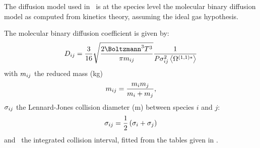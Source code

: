 The diffusion model used in \Antioch\ is at the species
level the molecular binary diffusion model as computed from kinetics
theory, assuming the ideal gas hypothesis.

The molecular binary diffusion coefficient is given by:
\begin{equation}
\diff[ij] = \frac{3}{16} \sqrt{\frac{2\Boltzmann^3\Temp^3}{\pi\Mass_{ij}}}\frac{1}{\Press\LJdia_{ij}^2\Stockmayer{1}}
\label{bimol_diff:eq}
\end{equation}
with $\Mass_{ij}$ the reduced mass (\unit{kg})
\begin{equation}
\Mass_{ij} = \frac{\Mass_i\Mass_j}{\Mass_i + \Mass_j},
\label{diffusion:bimol:red_mass}
\end{equation}
$\LJdia_{ij}$ the Lennard-Jones collision diameter (\unit{m})
between species $i$ and $j$:
\begin{equation}
\LJdia_{ij} = \frac{1}{2}\left(\LJdia_i + \LJdia_j\right)
\label{diffusion:bimol:LJdia}
\end{equation}
and \ the integrated collision interval, fitted from
the tables given in \citet{Monchick1961}.
